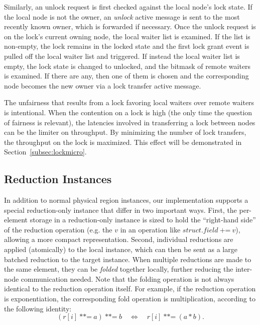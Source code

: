 Similarly, an unlock request is first checked against the local node's lock state.  If the local node is
not the owner, an {\em unlock} active message is sent to the most recently known owner, which is forwarded
if necessary.  Once the unlock request is on the lock's current owning node, the local waiter list is
examined.  If the list is non-empty, the lock remains in the locked state and the first lock grant
event is pulled off the local waiter list and triggered.  If instead the local waiter list is empty, the
lock state is changed to unlocked, and the bitmask of remote waiters is examined.  If there are any, then
one of them is chosen and the corresponding node becomes the new owner via a lock transfer active message.

The unfairness that results from a lock favoring local waiters over remote waiters is intentional.  When the
contention on a lock is high (the only time the question of fairness is relevant), the latencies
involved in transferring a lock between nodes can be the limiter on throughput.  By minimizing the number
of lock transfers, the throughput on the lock is maximized.  This effect will be demonstrated in
Section~\ref{subsec:lockmicro}.


\subsection{Reduction Instances}
\label{subsec:reducimpl}

In addition to normal physical region instances, our implementation supports a special reduction-only
instance that differ in two important ways.  First, the per-element storage in a reduction-only instance
is sized to hold the ``right-hand side'' of the reduction operation (e.g. the $v$ in an operation like
$struct.field\ \text{+=}\ v$), allowing a more compact representation.  Second, individual reductions are applied
(atomically) to the local instance, which can then be sent as a large batched reduction to the target
instance.  When multiple reductions are made to the same element, they can be {\em folded} together locally,
further reducing the inter-node communication needed.  Note that the folding operation is not always
identical to the reduction operation itself.  For example, if the reduction operation is exponentiation,
the corresponding fold operation is multiplication, according to the following identity:
$$(r[i]\ \text{**=}\ a)\ \text{**=}\ b \quad \Leftrightarrow \quad r[i]\ \text{**=}\ (a * b).$$

